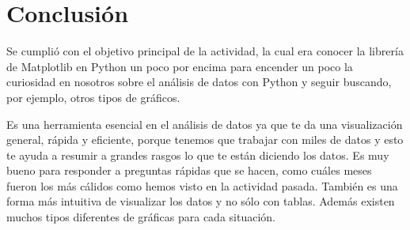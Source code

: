 \documentclass{article}
\begin{document}
\section{Conclusión}
\noindent Se cumplió con el objetivo principal de la actividad, la cual era conocer la librería de Matplotlib en Python un poco por encima para encender un poco la curiosidad en nosotros sobre el análisis de datos con Python y seguir buscando, por ejemplo, otros tipos de gráficos.

Es una herramienta esencial en el análisis de datos ya que te da una visualización general, rápida y eficiente, porque tenemos que trabajar con miles de datos y esto te ayuda a resumir a grandes rasgos lo que te están diciendo los datos. Es muy bueno para responder a preguntas rápidas que se hacen, como cuáles meses fueron los más cálidos como hemos visto en la actividad pasada. También es una forma más intuitiva de visualizar los datos y no sólo con tablas. Además existen muchos tipos diferentes de gráficas para cada situación. 

\clearpage
\end{document}
